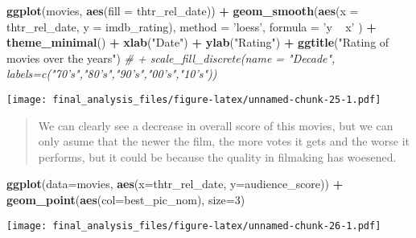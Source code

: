\documentclass[]{article}
\newenvironment{Shaded}{\begin{snugshade}}{\end{snugshade}}
\newcommand{\KeywordTok}[1]{\textcolor[rgb]{0.13,0.29,0.53}{\textbf{#1}}}
\newcommand{\DataTypeTok}[1]{\textcolor[rgb]{0.13,0.29,0.53}{#1}}
\newcommand{\DecValTok}[1]{\textcolor[rgb]{0.00,0.00,0.81}{#1}}
\newcommand{\StringTok}[1]{\textcolor[rgb]{0.31,0.60,0.02}{#1}}
\newcommand{\CommentTok}[1]{\textcolor[rgb]{0.56,0.35,0.01}{\textit{#1}}}
\newcommand{\OperatorTok}[1]{\textcolor[rgb]{0.81,0.36,0.00}{\textbf{#1}}}
\newcommand{\NormalTok}[1]{#1}
\begin{document}
\begin{Shaded}
\begin{Highlighting}[]
\KeywordTok{ggplot}\NormalTok{(movies, }\KeywordTok{aes}\NormalTok{(}\DataTypeTok{fill =}\NormalTok{ thtr_rel_date)) }\OperatorTok{+}\StringTok{ }\KeywordTok{geom_smooth}\NormalTok{(}\KeywordTok{aes}\NormalTok{(}\DataTypeTok{x =}\NormalTok{ thtr_rel_date, }\DataTypeTok{y =}\NormalTok{ imdb_rating), }\DataTypeTok{method =} \StringTok{'loess'}\NormalTok{, }\DataTypeTok{formula =} \StringTok{'y ~ x'}
\NormalTok{) }\OperatorTok{+}\StringTok{ }\KeywordTok{theme_minimal}\NormalTok{() }\OperatorTok{+}\StringTok{ }\KeywordTok{xlab}\NormalTok{(}\StringTok{"Date"}\NormalTok{) }\OperatorTok{+}\StringTok{ }\KeywordTok{ylab}\NormalTok{(}\StringTok{"Rating"}\NormalTok{) }\OperatorTok{+}\StringTok{ }\KeywordTok{ggtitle}\NormalTok{(}\StringTok{"Rating of  movies over the years"}\NormalTok{) }\CommentTok{# + scale_fill_discrete(name = "Decade", labels=c("70's","80's","90's","00's","10's"))}
\end{Highlighting}
\end{Shaded}

\texttt{[image: final\_analysis\_files/figure-latex/unnamed-chunk-25-1.pdf]}

\begin{quote}
We can clearly see a decrease in overall score of this movies, but we
can only asume that the newer the film, the more votes it gets and the
worse it performs, but it could be because the quality in filmaking has
woesened.
\end{quote}

\begin{Shaded}
\begin{Highlighting}[]
\KeywordTok{ggplot}\NormalTok{(}\DataTypeTok{data=}\NormalTok{movies, }\KeywordTok{aes}\NormalTok{(}\DataTypeTok{x=}\NormalTok{thtr_rel_date, }\DataTypeTok{y=}\NormalTok{audience_score)) }\OperatorTok{+}\StringTok{ }\KeywordTok{geom_point}\NormalTok{(}\KeywordTok{aes}\NormalTok{(}\DataTypeTok{col=}\NormalTok{best_pic_nom), }\DataTypeTok{size=}\DecValTok{3}\NormalTok{)}
\end{Highlighting}
\end{Shaded}

\texttt{[image: final\_analysis\_files/figure-latex/unnamed-chunk-26-1.pdf]}
\end{document}
